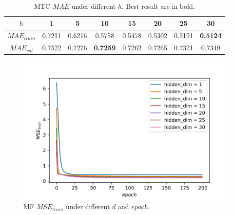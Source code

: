 \documentclass[journal, a4paper]{IEEEtran}
\begin{document}
\begin{table}[!hbt]
	\begin{center}
		\caption{MTC $MAE$ under different $h$. Best result are in bold.}
		\label{tab:h_mae}
		\begin{tabular}{|c|c|c|c|c|c|c|c|}
			\hline
			$h$  & 1 & 5 & 10 & 15 & 20 & 25 & 30 \\
			\hline
			$MAE_{train}$ & 0.7211 & 0.6216 & 0.5758 & 0.5478 & 0.5302 & 0.5191 & \textbf{0.5124}  \\
			\hline
			$MAE_{val}$  & 0.7522 & 0.7276 & \textbf{0.7259} & 0.7262 & 0.7265 &  0.7321 & 0.7349  \\
			\hline
		\end{tabular}
	\end{center}
\end{table} \par

\begin{figure}[!hbt]
	\begin{center}
		\includegraphics[width=\columnwidth]{h_tr_losses}
		\caption{MF $MSE_{train}$ under different $d$ and $epoch$. }
		\label{fig:h_tr_losses}
	\end{center}
\end{figure} \par
\end{document}
